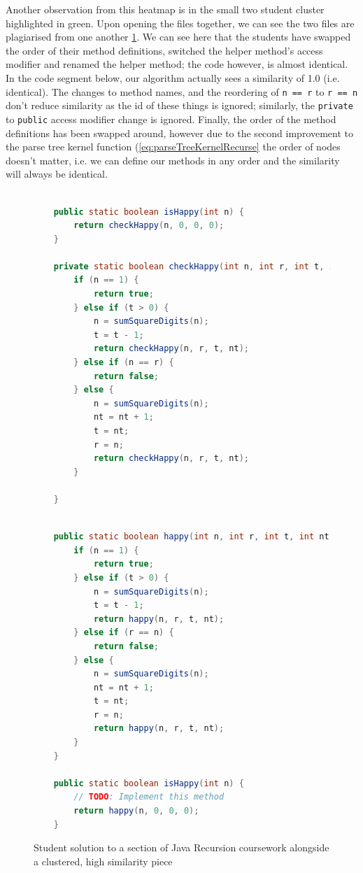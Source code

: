 Another observation from this heatmap is in the small two student cluster highlighted
in green. Upon opening the files together, we can see the two files are
plagiarised from one another \cref{code:recursionPlag}. We can see here that the
students have swapped the order of their method definitions, switched the
helper method's access modifier and renamed the helper method; the code however,
is almost identical. In the code segment below, our algorithm actually sees a
similarity of 1.0 (i.e. identical). The changes to method names, and the
reordering of \texttt{n == r} to \texttt{r == n} don't reduce similarity
as the id of these things is ignored; similarly, the \texttt{private} to 
\texttt{public} access modifier change is ignored. Finally, the order of the
method definitions has been swapped around, however due to the second improvement
to the parse tree kernel function (\cref{eq:parseTreeKernelRecurse}
the order of nodes doesn't matter, i.e. we can define our methods in any order
and the similarity will always be identical.

\begin{figure}[H]
\begin{minipage}[b]{0.45\linewidth}
\begin{lstlisting}[language=Java]

	public static boolean isHappy(int n) {
		return checkHappy(n, 0, 0, 0);
	}

	private static boolean checkHappy(int n, int r, int t, int nt) {
		if (n == 1) {
			return true;
		} else if (t > 0) {
			n = sumSquareDigits(n);
			t = t - 1;
			return checkHappy(n, r, t, nt);
		} else if (n == r) {
			return false;
		} else {
			n = sumSquareDigits(n);
			nt = nt + 1;
			t = nt;
			r = n;
			return checkHappy(n, r, t, nt);
		}

	}
\end{lstlisting}
\end{minipage}
\hspace{0.5cm}
\begin{minipage}[b]{0.45\linewidth}
\begin{lstlisting}[language=Java]

	public static boolean happy(int n, int r, int t, int nt) {
		if (n == 1) {
			return true;
		} else if (t > 0) {
			n = sumSquareDigits(n);
			t = t - 1;
			return happy(n, r, t, nt);
		} else if (r == n) {
			return false;
		} else {
			n = sumSquareDigits(n);
			nt = nt + 1;
			t = nt;
			r = n;
			return happy(n, r, t, nt);
		}
	}

	public static boolean isHappy(int n) {
		// TODO: Implement this method
		return happy(n, 0, 0, 0);
	}

\end{lstlisting}
\end{minipage}
\caption{Student solution to a section of Java Recursion coursework alongside
a clustered, high similarity piece}
\label{code:recursionPlag}
\end{figure}


